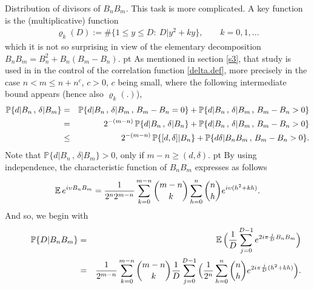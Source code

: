 \documentclass[11pt,draft,reqno]{amsart}
\makeatletter
\def\section{\@startsection{section}{1}%
     \z@{.7\linespacing\@plus\linespacing}{.5\linespacing}%
     {\bfseries%
     \centering
     }}
\theoremstyle{definition}
\theoremstyle{remarks}
\numberwithin{equation}{section}
\def \d{{\delta}}
\def \qq{{\qquad}}
\def\P{{\mathcal P}}
\def\E{{\mathbb E \,}}
\def\P{{\mathbb P}}
\makeatother
\begin{document}
\section{Distribution of   divisors of ${ B_nB_m}$.}\label{s6}
This task is more complicated.
 A key function is  the  (multiplicative) function
\begin{eqnarray}\label{rho}\varrho_k(D):=\#\big\{1\le y\le D: \  D| y^2+ky \big\} ,\qq   k=0,1,\ldots
\end{eqnarray} 
 which  it is not so surprising in view of the elementary decomposition
$B_nB_m= B_n^2 +B_n(B_m-B_n)$. 
 pt
As  mentioned in section \ref{s3}, that study is used in   
  \cite{W14} in the  control of   the correlation function \eqref{delta.def}, more precisely in the case      $n<m\le n+n^c$, $c>0$, $c$ being small, where the following intermediate bound appears (hence also $\varrho_k(.)$),
\begin{eqnarray*}\P \{ 
d|B_n\, ,\, \d|B_m \}
& =&\P \{  d|B_n\, ,\, \d|B_m\, ,\,B_m-B_n=0 \}
 +\P \{ 
d|B_n\, ,\, \d|B_m\, ,\,B_m-B_n>0 \}
\cr & =&2^{-(m-n)}\,\P \{  d|B_n\, ,\, \d|B_n \}  
 +\P \{ 
d|B_n\, ,\, \d|B_m\, ,\,B_m-B_n>0 \}
\cr &\le& 2^{-(m-n)}\,\P \{ [d, \d]|B_n  \}
+\P \{ 
d\d|B_n B_m\, ,\,B_m-B_n>0 \}.
\end{eqnarray*} 
Note that $\P \{ 
d|B_n\, ,\, \d|B_m \}>0$, only if $m-n\ge (d,\d)$. 
  pt  
  By using independence,  
  the characteristic function of $B_nB_m$ expresses as follows
$$\E e^{i\upsilon B_nB_m}={1\over 2^n2^{m-n}}\sum_{k=0}^{m-n} {{m-n}\choose {k}}\sum_{h=0}^n   {{n}\choose{h}} e^{i\upsilon (h^2+kh)}.$$
And so, we begin with 
\begin{eqnarray}\label{basicnm}\qq   \P \{ D|B_nB_m \} &=& \E\Big({1\over D} \sum_{j=0}^{D-1} e^{2i\pi  {j \over D}B_nB_m}\Big) 
\cr &=&  {1\over
2^{m-n}}\sum_{k=0}^{m-n}{{m-n}\choose {k}}{1\over D}\sum_{j=0}^{D-1}\Big({1\over
2^n}\sum_{h=0}^n   {{n}\choose{h}} e^{2i\pi{j\over D}  (h^2+kh)}\Big). 
\end{eqnarray}  
\end{document}
